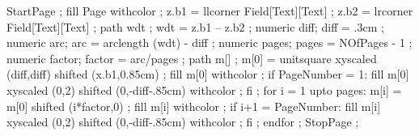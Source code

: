 



StartPage ;
fill Page withcolor  ;
z.b1 = llcorner Field[Text][Text] ;
z.b2 = lrcorner Field[Text][Text] ;
path wdt ;
wdt = z.b1 -- z.b2 ;
numeric diff; diff = .3cm ;
numeric arc; arc = arclength (wdt) - diff ;
numeric pages; pages = NOfPages - 1 ;
numeric factor; factor = arc/pages ;
path m[] ;
m[0] = unitsquare xyscaled (diff,diff) shifted (x.b1,0.85cm) ;
fill m[0] withcolor  ;
if PageNumber = 1:
	fill m[0] xyscaled (0,2) shifted (0,-diff-.85cm) withcolor  ;
fi ;
for i = 1 upto pages:
	m[i] = m[0] shifted (i*factor,0) ;
	fill m[i] withcolor  ;
	if i+1 = PageNumber:
		fill m[i] xyscaled (0,2) shifted (0,-diff-.85cm) withcolor  ;
	fi ;
endfor ;
StopPage ;
\stopuseMPgraphic 




\lecback{\setuplayout[header=1cm]\setupbackgrounds[page][background={lecbackground,slidetitle}]}
\titback{\setuplayout[header=0cm]\setupbackgrounds[page][background=lecbackground]}
\picback{\setuplayout[header=0cm]\setupbackgrounds[page][background={lecbackground,slidetitle}]}
\noback{\setupbackgrounds[page][background=nobackground]}


\setupcombinations[distance=0cm]


\setupitemize[1][color=b]

\protect
\stopmodule

\endinput

